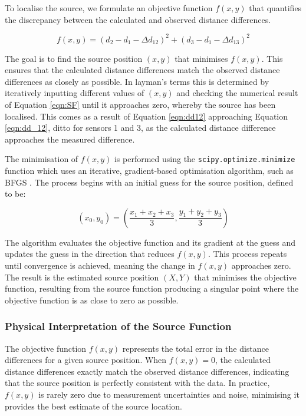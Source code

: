 To localise the source, we formulate an objective function \( f(x, y) \) that quantifies the discrepancy between the calculated and observed distance differences.

\begin{equation}
f(x, y) = (d_2 - d_1 - \Delta d_{12})^2 + (d_3 - d_1 - \Delta d_{13})^2
\label{eqn:SF}
\end{equation}

The goal is to find the source position \( (x, y) \) that minimises \( f(x, y) \). This ensures that the calculated distance differences match the observed distance differences as closely as possible. In layman's terms this is determined by iteratively inputting different values of $(x,y)$ and checking the numerical result of Equation \ref{eqn:SF} until it approaches zero, whereby the source has been localised. This comes as a result of Equation \ref{eqn:dd12} approaching Equation \ref{eqn:dd_12}, ditto for sensors 1 and 3, as the calculated distance difference approaches the measured difference.

The minimisation of \( f(x, y) \) is performed using the \lstinline{scipy.optimize.minimize} function which uses an iterative, gradient-based optimisation algorithm, such as BFGS \cite{BFGSscipy} \cite{enwiki:1273231919}. The process begins with an initial guess for the source position, defined to be:

\begin{equation}
(x_0, y_0) = \left( \frac{x_1 + x_2 + x_3}{3}, \frac{y_1 + y_2 + y_3}{3} \right)
\end{equation}

The algorithm evaluates the objective function and its gradient at the guess and updates the guess in the direction that reduces \( f(x, y) \). This process repeats until convergence is achieved, meaning the change in \( f(x, y) \) approaches zero. The result is the estimated source position \( (X, Y) \) that minimises the objective function, resulting from the source function producing a singular point where the objective function is as close to zero as possible.

\subsubsection{Physical Interpretation of the Source Function}
The objective function \( f(x, y) \) represents the total error in the distance differences for a given source position. When \( f(x, y) = 0 \), the calculated distance differences exactly match the observed distance differences, indicating that the source position is perfectly consistent with the data. In practice, \( f(x, y) \) is rarely zero due to measurement uncertainties and noise, minimising it provides the best estimate of the source location.

